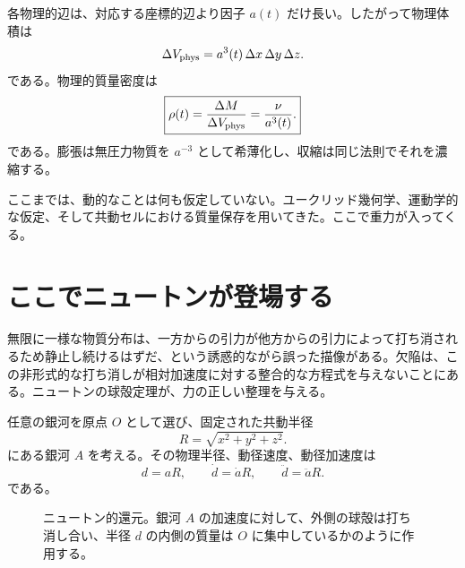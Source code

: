 各物理的辺は、対応する座標的辺より因子 \(a(t)\) だけ長い。したがって物理体積は
\begin{equation}
\Delta V_{\rm phys}=a^3(t)\,\Delta x\,\Delta y\,\Delta z.
\end{equation}
である。物理的質量密度は
\begin{equation}
\boxed{\rho(t)=\frac{\Delta M}{\Delta V_{\rm phys}}=\frac{\nu}{a^3(t)}.}
\label{eq:c01-density-dilution}
\end{equation}
である。膨張は無圧力物質を \(a^{-3}\) として希薄化し、収縮は同じ法則でそれを濃縮する。

ここまでは、動的なことは何も仮定していない。ユークリッド幾何学、運動学的な仮定、そして共動セルにおける質量保存を用いてきた。ここで重力が入ってくる。

\section{ここでニュートンが登場する}

無限に一様な物質分布は、一方からの引力が他方からの引力によって打ち消されるため静止し続けるはずだ、という誘惑的ながら誤った描像がある。欠陥は、この非形式的な打ち消しが相対加速度に対する整合的な方程式を与えないことにある。ニュートンの球殻定理が、力の正しい整理を与える。

任意の銀河を原点 \(O\) として選び、固定された共動半径
\begin{equation}
R=\sqrt{x^2+y^2+z^2}.
\end{equation}
にある銀河 \(A\) を考える。その物理半径、動径速度、動径加速度は
\begin{equation}
d=aR,
\qquad
\dot d=\dot a R,
\qquad
\ddot d=\ddot a R.
\label{eq:c01-radial-kinematics}
\end{equation}
である。

\begin{figure}[ht]
\centering
{}
\caption{ニュートン的還元。銀河 \(A\) の加速度に対して、外側の球殻は打ち消し合い、半径 \(d\) の内側の質量は \(O\) に集中しているかのように作用する。}
\label{fig:c01-newton-sphere}
\end{figure}

